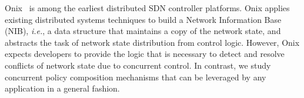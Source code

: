 \documentclass[11pt,pdftex,letter]{article}
\newcommand{\ie}{{\it i.e.}}
\newcommand{\etal}{{\it et al.}\xspace}
\newcommand{\mcnote}[1]{\textcolor{heraldBlue}{\small \bf [MC: #1]}}
\newcommand{\mcnote}[1]{}
\newcommand{\ignore}[1]{}
\begin{document}
Onix~\cite{onix} is among the earliest distributed SDN controller platforms.
Onix applies existing distributed systems techniques to build a Network
Information Base (NIB), \ie, a data structure that maintains a copy of the
network state, and abstracts the task of network state distribution from
control logic. However, Onix expects developers to provide the logic that is
necessary to detect and resolve conflicts of network state due to concurrent
control. In contrast, we study concurrent policy composition mechanisms that
can be leveraged by any application in a general fashion.

\ignore{
\mcnote{Removing to save space. We add it back for camera ready}
The costs of implementing logically centralized network control, providing
various levels of consistency, over a distributed system are subjected to a
sensitivity study in~\cite{log-cent}.
}
\end{document}
